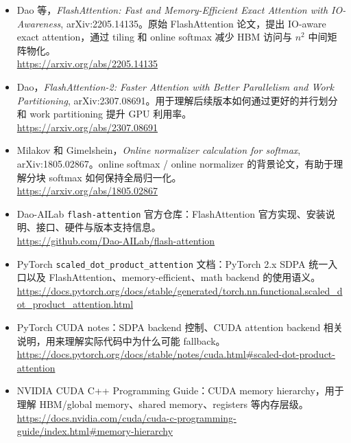 \begingroup
\small
\sloppy
\begin{itemize}[leftmargin=1.5em]
  \item Dao 等，\emph{FlashAttention: Fast and Memory-Efficient Exact Attention with IO-Awareness}, arXiv:2205.14135。原始 FlashAttention 论文，提出 IO-aware exact attention，通过 tiling 和 online softmax 减少 HBM 访问与 $n^2$ 中间矩阵物化。\\
  \url{https://arxiv.org/abs/2205.14135}
  \item Dao，\emph{FlashAttention-2: Faster Attention with Better Parallelism and Work Partitioning}, arXiv:2307.08691。用于理解后续版本如何通过更好的并行划分和 work partitioning 提升 GPU 利用率。\\
  \url{https://arxiv.org/abs/2307.08691}
  \item Milakov 和 Gimelshein，\emph{Online normalizer calculation for softmax}, arXiv:1805.02867。online softmax / online normalizer 的背景论文，有助于理解分块 softmax 如何保持全局归一化。\\
  \url{https://arxiv.org/abs/1805.02867}
  \item Dao-AILab \texttt{flash-attention} 官方仓库：FlashAttention 官方实现、安装说明、接口、硬件与版本支持信息。\\
  \url{https://github.com/Dao-AILab/flash-attention}
  \item PyTorch \texttt{scaled\_dot\_product\_attention} 文档：PyTorch 2.x SDPA 统一入口以及 FlashAttention、memory-efficient、math backend 的使用语义。\\
  \url{https://docs.pytorch.org/docs/stable/generated/torch.nn.functional.scaled_dot_product_attention.html}
  \item PyTorch CUDA notes：SDPA backend 控制、CUDA attention backend 相关说明，用来理解实际代码中为什么可能 fallback。\\
  \url{https://docs.pytorch.org/docs/stable/notes/cuda.html#scaled-dot-product-attention}
  \item NVIDIA CUDA C++ Programming Guide：CUDA memory hierarchy，用于理解 HBM/global memory、shared memory、registers 等内存层级。\\
  \url{https://docs.nvidia.com/cuda/cuda-c-programming-guide/index.html#memory-hierarchy}
\end{itemize}
\endgroup
